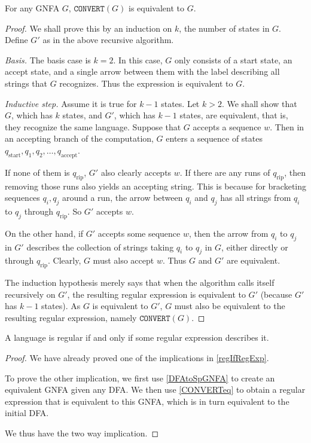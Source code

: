 \begin{lemma}
\label{CONVERTeq}
For any GNFA $G$, $\texttt{CONVERT}(G)$ is equivalent to $G$.
\end{lemma}
\begin{proof}
We shall prove this by an induction on $k$, the number of states in $G$. Define $G'$ as in the above recursive algorithm.

\vspace{2mm}
\textit{Basis.} The basis case is $k=2$. In this case, $G$ only consists of a start state, an accept state, and a single arrow between them with the label describing all strings that $G$ recognizes. Thus the expression is equivalent to $G$.

\vspace{2mm}
\textit{Inductive step.} Assume it is true for $k-1$ states. Let $k>2$. We shall show that $G$, which has $k$ states, and $G'$, which has $k-1$ states, are equivalent, that is, they recognize the same language. Suppose that $G$ accepts a sequence $w$. Then in an accepting branch of the computation, $G$ enters a sequence of states $q_{\text{start}},q_1,q_2,\ldots,q_{\text{accept}}$.

If none of them is $q_{\text{rip}}$, $G'$ also clearly accepts $w$. If there are any runs of $q_{\text{rip}}$, then removing those runs also yields an accepting string. This is because for bracketing sequences $q_i,q_j$ around a run, the arrow between $q_i$ and $q_j$ has all strings from $q_i$ to $q_j$ through $q_\text{rip}$. So $G'$ accepts $w$.

On the other hand, if $G'$ accepts some sequence $w$, then the arrow from $q_i$ to $q_j$ in $G'$ describes the collection of strings taking $q_i$ to $q_j$ in $G$, either directly or through $q_\text{rip}$. Clearly, $G$ must also accept $w$. Thus $G$ and $G'$ are equivalent.

\vspace{2mm}
The induction hypothesis merely says that when the algorithm calls itself recursively on $G'$, the resulting regular expression is equivalent to $G'$ (because $G'$ has $k-1$ states). As $G$ is equivalent to $G'$, $G$ must also be equivalent to the resulting regular expression, namely $\texttt{CONVERT}(G)$.
\end{proof}

\vspace{1mm}
\begin{theorem}
\label{regIffRegExp}
A language is regular if and only if some regular expression describes it.
\end{theorem}
\begin{proof}
We have already proved one of the implications in \ref{regIfRegExp}.

To prove the other implication, we first use \ref{DFAtoSpGNFA} to create an equivalent GNFA given any DFA. We then use \ref{CONVERTeq} to obtain a regular expression that is equivalent to this GNFA, which is in turn equivalent to the initial DFA.

\vspace{2mm}
We thus have the two way implication.
\end{proof}

